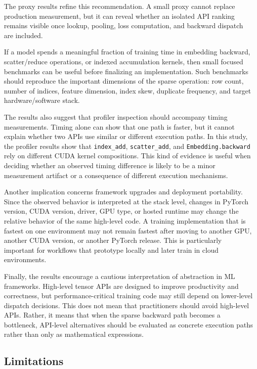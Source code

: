 The proxy results refine this recommendation. A small proxy cannot replace production measurement, but it can reveal whether an isolated API ranking remains visible once lookup, pooling, loss computation, and backward dispatch are included.

If a model spends a meaningful fraction of training time in embedding backward, scatter/reduce operations, or indexed accumulation kernels, then small focused benchmarks can be useful before finalizing an implementation. Such benchmarks should reproduce the important dimensions of the sparse operation: row count, number of indices, feature dimension, index skew, duplicate frequency, and target hardware/software stack.

The results also suggest that profiler inspection should accompany timing measurements. Timing alone can show that one path is faster, but it cannot explain whether two APIs use similar or different execution paths. In this study, the profiler results show that \texttt{index\_add}, \texttt{scatter\_add}, and \texttt{Embedding.backward} rely on different CUDA kernel compositions. This kind of evidence is useful when deciding whether an observed timing difference is likely to be a minor measurement artifact or a consequence of different execution mechanisms.

Another implication concerns framework upgrades and deployment portability. Since the observed behavior is interpreted at the stack level, changes in PyTorch version, CUDA version, driver, GPU type, or hosted runtime may change the relative behavior of the same high-level code. A training implementation that is fastest on one environment may not remain fastest after moving to another GPU, another CUDA version, or another PyTorch release. This is particularly important for workflows that prototype locally and later train in cloud environments.

Finally, the results encourage a cautious interpretation of abstraction in ML frameworks. High-level tensor APIs are designed to improve productivity and correctness, but performance-critical training code may still depend on lower-level dispatch decisions. This does not mean that practitioners should avoid high-level APIs. Rather, it means that when the sparse backward path becomes a bottleneck, API-level alternatives should be evaluated as concrete execution paths rather than only as mathematical expressions.

\subsection{Limitations}

